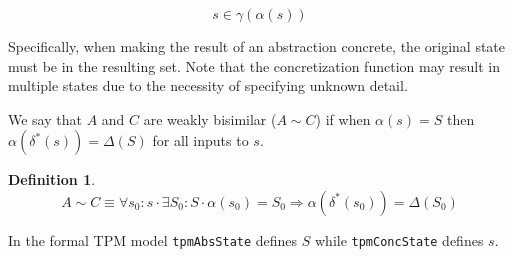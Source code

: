 \documentclass[10pt]{article}
\newtheorem{definition}{Definition}
\begin{document}
\[s\in\gamma(\alpha(s))\]

\noindent Specifically, when making the result of an abstraction
concrete, the original state must be in the resulting set.  Note that
the concretization function may result in multiple states due to the
necessity of specifying unknown detail.

We say that $A$ and $C$ are weakly bisimilar ($A\sim C$) if when
$\alpha(s)=S$ then $\alpha(\delta^*(s))=\Delta(S)$ for all inputs to
$s$.

\begin{definition} 
  \[A\sim C \equiv \forall s_0:s \cdot \exists S_0:S \cdot
  \alpha(s_0)=S_0 \Rightarrow \alpha(\delta^*(s_0))=\Delta(S_0)\]
  \label{def:bisimulation}
\end{definition}

In the formal TPM model \texttt{tpmAbsState} defines $S$ while
\texttt{tpmConcState} defines $s$.

\appendix





\end{document}
